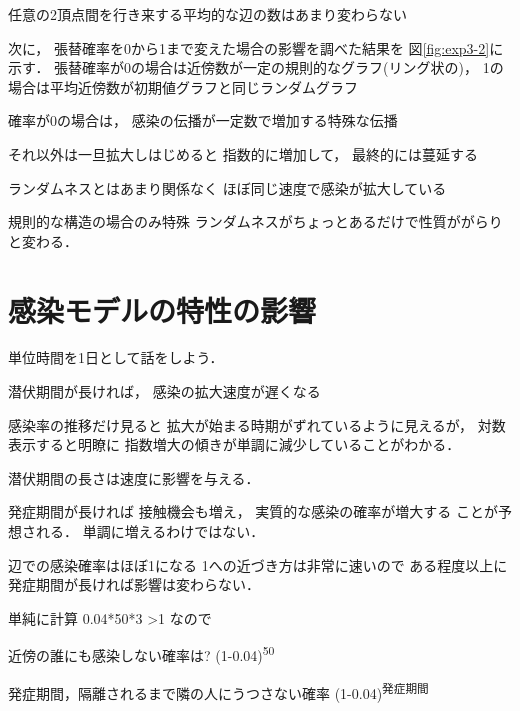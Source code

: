 \documentclass[10pt,oneside]{scrartcl}
\begin{document}
任意の2頂点間を行き来する平均的な辺の数はあまり変わらない


次に，
張替確率を0から1まで変えた場合の影響を調べた結果を
図\ref{fig:exp3-2}に示す．
張替確率が0の場合は近傍数が一定の規則的なグラフ(リング状の)，
1の場合は平均近傍数が初期値グラフと同じランダムグラフ

確率が0の場合は，
感染の伝播が一定数で増加する特殊な伝播

それ以外は一旦拡大しはじめると
指数的に増加して，
最終的には蔓延する

ランダムネスとはあまり関係なく
ほぼ同じ速度で感染が拡大している

規則的な構造の場合のみ特殊
ランダムネスがちょっとあるだけで性質ががらりと変わる．


\begin{figure*}%
  \centering
\end{figure*}

\section{感染モデルの特性の影響}
\label{sec:org2b389a0}

単位時間を1日として話をしよう．

潜伏期間が長ければ，
感染の拡大速度が遅くなる

感染率の推移だけ見ると
拡大が始まる時期がずれているように見えるが，
対数表示すると明瞭に
指数増大の傾きが単調に減少していることがわかる．

潜伏期間の長さは速度に影響を与える．

\begin{figure*}%
  \centering
\end{figure*}

発症期間が長ければ
接触機会も増え，
実質的な感染の確率が増大する
ことが予想される．
単調に増えるわけではない．

辺での感染確率はほぼ1になる
1への近づき方は非常に速いので
ある程度以上に発症期間が長ければ影響は変わらない．

単純に計算
0.04*50*3 >1  なので

近傍の誰にも感染しない確率は?
(1-0.04)\textsuperscript{50}

発症期間，隔離されるまで隣の人にうつさない確率
(1-0.04)\textsuperscript{発症期間} 
\end{document}
